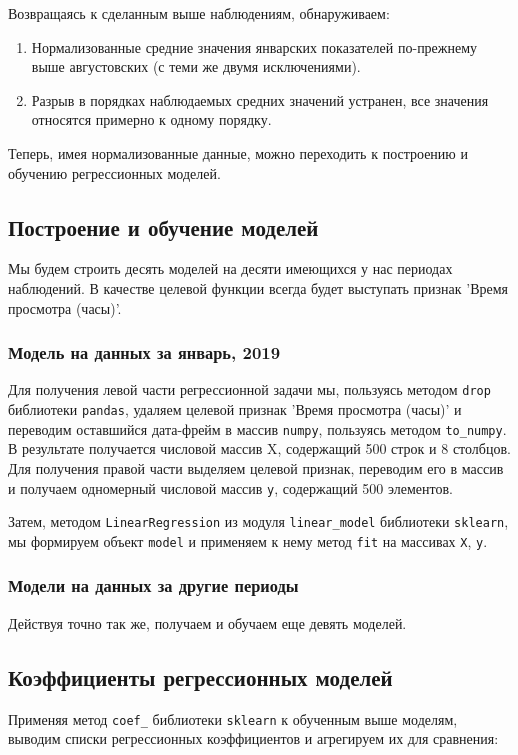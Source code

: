 \documentclass[a4paper,12pt]{article}
\begin{document}
\noindent
Возвращаясь к сделанным выше наблюдениям, обнаруживаем:
\medskip
\begin{enumerate}
	\item Нормализованные средние значения январских показателей по-прежнему выше августовских (с теми же двумя исключениями).
	\item Разрыв в порядках наблюдаемых средних значений устранен, все значения относятся примерно к одному порядку.
\end{enumerate}
\medskip
Теперь, имея нормализованные данные, можно переходить к построению и обучению регрессионных моделей.

\subsection{Построение и обучение  моделей}

Мы будем строить десять моделей на десяти имеющихся у нас периодах наблюдений. В качестве целевой функции всегда будет выступать признак 'Время просмотра (часы)'.

\subsubsection{ Модель на данных за январь, 2019} 

Для получения левой части регрессионной задачи мы, пользуясь  методом \texttt{drop} библиотеки \texttt{pandas}, удаляем целевой признак 'Время просмотра (часы)' и переводим оставшийся дата-фрейм в массив \texttt{numpy}, пользуясь методом \texttt{to\_numpy}. В результате получается числовой массив X, содержащий  500 строк и 8 столбцов. Для получения правой части выделяем целевой признак, переводим его в массив и получаем одномерный числовой массив \texttt{y}, содержащий 500 элементов.

Затем, методом \texttt{LinearRegression} из модуля \texttt{linear\_model} библиотеки \texttt{sklearn}, мы формируем объект \texttt{model} и применяем к нему метод \texttt{fit} на массивах \texttt{X}, \texttt{y}.

\subsubsection{Модели на данных за другие периоды} 

Действуя точно так же, получаем и обучаем еще девять моделей.

\subsection{Коэффициенты регрессионных моделей}
Применяя метод \texttt{coef\_} библиотеки  \texttt{sklearn} к обученным выше моделям, выводим списки регрессионных коэффициентов и агрегируем их для сравнения:
\end{document}
